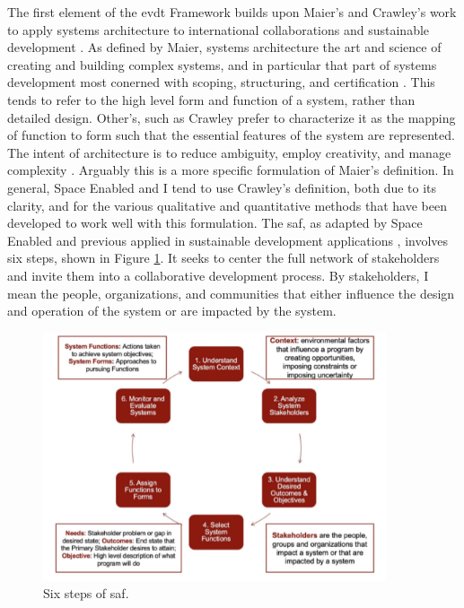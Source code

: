 The first element of the \ac{evdt} Framework builds upon Maier's \cite{maierArtSystemsArchitecting2009} and Crawley's \cite{crawley2004} work to apply systems architecture to international collaborations \cite{pfotenhauerArchitectingComplexInternational2016} and sustainable development \cite{ovienmhadaInclusiveDesignEarth2021}. As defined by Maier, systems architecture the art and science of creating and building complex systems, and in particular that part of systems development most conerned with scoping, structuring, and certification \cite{maierArtSystemsArchitecting2009}. This tends to refer to the high level form and function of a system, rather than detailed design. Other's, such as Crawley prefer to characterize it as the mapping of function to form such that the essential features of the system are represented. The intent of architecture is to reduce ambiguity, employ creativity, and manage complexity \cite{crawleySystemArchitectureStrategy2015}. Arguably this is a more specific formulation of Maier's definition. In general, Space Enabled and I tend to use Crawley's definition, both due to its clarity, and for the various qualitative and quantitative methods that have been developed to work well with this formulation. The \ac{saf}, as adapted by Space Enabled and previous applied in sustainable development applications \cite{ovienmhadaInclusiveDesignEarth2021}, involves six steps, shown in Figure \ref{fig:saf}. It seeks to center the full network of stakeholders and invite them into a collaborative development process. By stakeholders, I mean the people, organizations, and communities that either influence the design and operation of the system or are impacted by the system. 

\begin{figure}[t] 
\centering
\includegraphics[width=0.9\textwidth]{Figures/chap3/SAF.png}
\caption[Six steps of SAF]{Six steps of \ac{saf}.}
\label{fig:saf}
\end{figure}

